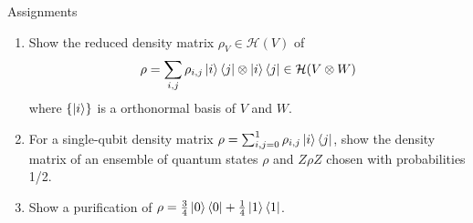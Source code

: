 \documentclass[10pt]{beamer}
\begin{document}
\begin{frame}{Assignments}
\begin{enumerate}
\setlength{\itemsep}{2em}
\item Show the reduced density matrix $\rho_V\in \mathcal{H}(V)$ of
\begin{equation*}
\rho=\sum_{i,j}\rho_{i,j}\ket{i}\bra{j}\otimes \ket{i}\bra{j}
\in \mathcal{H}(V\otimes W)
\end{equation*}
where $\{\ket{i}\}$ is a orthonormal basis of $V$ and $W$.
\item For a single-qubit density matrix $\rho=\sum_{i,j=0}^1\rho_{i,j}\ket{i}\bra{j}$,
show the density matrix of an ensemble of quantum states $\rho$ and $Z\rho Z$ chosen with probabilities 1/2.
\item Show a purification of $\rho=\frac34\ket{0}\bra{0}+\frac14\ket{1}\bra{1}$.
\end{enumerate}
\end{frame}
\end{document}
